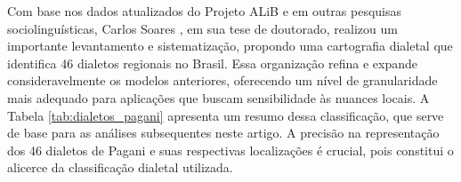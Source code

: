 Com base nos dados atualizados do Projeto ALiB e em outras pesquisas sociolinguísticas, Carlos Soares \cite{pagani2022}, em sua tese de doutorado, realizou um importante levantamento e sistematização, propondo uma cartografia dialetal que identifica 46 dialetos regionais no Brasil. Essa organização refina e expande consideravelmente os modelos anteriores, oferecendo um nível de granularidade mais adequado para aplicações que buscam sensibilidade às nuances locais. A Tabela \ref{tab:dialetos_pagani} apresenta um resumo dessa classificação, que serve de base para as análises subsequentes neste artigo. A precisão na representação dos 46 dialetos de Pagani e suas respectivas localizações é crucial, pois constitui o alicerce da classificação dialetal utilizada.



